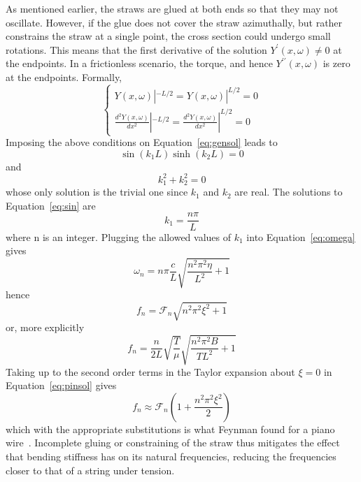 \documentclass[twoside]{article}
\begin{document}
\begin{multicols}{2}
As mentioned earlier, the straws are glued at both ends so that they may not oscillate. However, if the glue does not cover the straw azimuthally, but rather constrains the straw at a single point, the cross section could undergo small rotations.  This means that the first derivative of the solution $Y^\prime(x,\omega) \neq 0$ at the endpoints. In a frictionless scenario, the torque, and hence $Y^{\prime\prime}(x,\omega)$  is zero at the endpoints. Formally,
\begin{equation}
\label{eq:pinned}
\begin{cases}
Y(x,\omega)|^{-L/2} = Y(x,\omega)|^{L/2} = 0 \\
\frac{d^2Y(x,\omega)}{dx^2}|^{-L/2} = \frac{d^2Y(x,\omega)}{dx^2}|^{L/2} = 0 
\end{cases} 
\end{equation}
Imposing the above conditions on Equation~\ref{eq:gensol} leads to
\begin{equation}
\sin(k_1 L)\sinh(k_2L) = 0
\label{eq:sin}
\end{equation}
and 
\begin{equation}
k^2_1 + k^2_2 = 0
\end{equation}
whose only solution is the trivial one since $k_1$ and $k_2$ are real. The solutions to Equation~\ref{eq:sin} are
\begin{equation}
k_1 = \frac{n\pi}{L}
\end{equation}
where n is an integer. Plugging the allowed values of $k_1$ into Equation~\ref{eq:omega} gives
\begin{equation}
\omega_n = n \pi \frac{c}{L} \sqrt{ \frac{n^2\pi^2\eta}{L^2} + 1}
\end{equation} 
hence
\begin{equation}
\boxed{
	f_n =  \mathcal{F}_n \sqrt{n^2\pi^2\xi^2 + 1}
}
\label{eq:pinsol}
\end{equation}
or, more explicitly
\begin{equation}
\label{eq:clamped2}
f_n =  \frac{n}{2L}\sqrt{\frac{T}{\mu}}  \sqrt{\frac{n^2\pi^2B}{TL^2} + 1}
\end{equation}
Taking up to the second order terms in the Taylor expansion about $\xi = 0$ in Equation~\ref{eq:pinsol} gives
\begin{equation}
f_n \approx \mathcal{F}_n (1 + \frac{n^2\pi^2\xi^2}{2})
\label{eq:pinapprox}
\end{equation}
which with the appropriate substitutions is what Feynman found for a piano wire~\cite{dick}. 
Incomplete gluing or constraining of the straw thus mitigates the effect that bending stiffness has on its natural frequencies, reducing the frequencies closer to that of a string under tension. 



\end{multicols}
\end{document}
